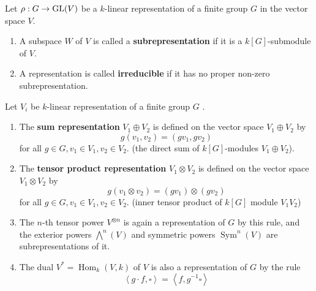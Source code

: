 \documentclass[12pt, oneside]{book}
\begin{document}
\begin{definition}
    Let $\rho : G \rightarrow\operatorname{\operatorname{GL}}(V)$ be a $k$-linear representation of a finite group $G$ in the vector space $V$.
    \begin{enumerate}
        \item
              A subspace $W$ of $V$ is called a \textbf{subrepresentation} if it is a $k[G]$-submodule of $V$.

        \item
              A representation is called \textbf{irreducible} if it has no proper non-zero subrepresentation.
    \end{enumerate}
\end{definition}


\begin{definition}
    Let $V_i$ be $k$-linear representation of a finite group $G$ .
    \begin{enumerate}
        \item
              The \textbf{sum representation} $V_1 \oplus V_2$ is defined on the vector space $V_1 \oplus V_2$ by
              \begin{equation*}
                  g\left(v_1, v_2\right)=\left(g v_1, g v_2\right)
              \end{equation*}
              for all $g \in G, v_1 \in V_1, v_2 \in V_2$.
              (the direct sum of $k[G]$-modules $V_1 \oplus V_2$).
        \item
              The \textbf{tensor product representation} $V_1 \otimes V_2$ is defined on the vector space $V_1 \otimes V_2$ by
              \begin{equation*}
                  g\left(v_1 \otimes v_2\right)=\left(g v_1\right) \otimes\left(g v_2\right)
              \end{equation*}
              for all $g \in G, v_1 \in V_1, v_2 \in V_2$. (inner tensor product of $k[G]$ module $V_1 V_2$)
        \item
              The $n$-th tensor power $V^{\otimes n}$ is again a representation of $G$ by this rule, and the exterior powers $\bigwedge^n(V)$ and symmetric powers $\operatorname{Sym}^n(V)$ are subrepresentations of it.

        \item
              The dual $V^*=\operatorname{Hom}_k(V, k)$ of $V$ is also a representation of $G$ by the rule
              \begin{equation*}
                  \left\langle g\cdot f, \square \right\rangle
                  =
                  \left\langle f,g^{-1}\square \right\rangle
              \end{equation*}
    \end{enumerate}
\end{definition}
\end{document}
